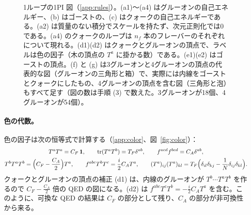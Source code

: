 \documentclass[a4paper,10pt]{ltjsarticle}
\newcommand{\tr}{\mathrm{tr}}
\begin{document}
\begin{figure}[tbp]
\caption{1ループの1PI 図（\ref{app:rules}）。(a1)〜(a4) はグルーオンの自己エネルギー、(b) はゴーストの、(c) はクォークの自己エネルギーである。(a2) は質量のない積分でスケールを持たず、次元正則化では0である。(a4) のクォークのループは $n_f$ 本のフレーバーのそれぞれについて現れる。(d1)(d2) はクォークとグルーオンの頂点で、ラベルは色の因子（木の頂点の $T^a$ に掛かる数）である。(e1)(e2) はゴーストの頂点。(f) と (g) は3グルーオンと4グルーオンの頂点の代表的な図（グルーオンの三角形と箱）で、実際には内線をゴーストとクォークにしたもの、4グルーオンの頂点を含む図（三角形と泡）もすべて足す（図の数は手順 (3) で数えた。3グルーオンが18個、4グルーオンが54個）。}
\label{fig:oneloop}
\end{figure}

\paragraph{色の代数。}色の因子は次の恒等式で計算する（\ref{app:color}、図~\ref{fig:color}）：
\begin{equation}
\begin{gathered}
T^aT^a=C_F\,\mathbf 1,\qquad \tr(T^aT^b)=T_F\delta^{ab},\qquad f^{acd}f^{bcd}=C_A\delta^{ab},\\
T^bT^aT^b=\Bigl(C_F-\frac{C_A}2\Bigr)T^a,\qquad f^{abc}T^bT^c=\frac i2C_AT^a,\qquad
(T^a)_{ij}(T^a)_{kl}=T_F\Bigl(\delta_{il}\delta_{kj}-\frac1N\delta_{ij}\delta_{kl}\Bigr).
\end{gathered}
\label{eq:color}
\end{equation}
クォークとグルーオンの頂点の補正 (d1) は、内線のグルーオンが $T^b\cdots T^aT^b$ を作るので $C_F-\frac{C_A}2$ 倍の QED の図になる。(d2) は $f^{abc}T^cT^b=-\frac i2C_AT^a$ を含む。このように、可換な QED の結果は $C_F$ の部分として残り、$C_A$ の部分が非可換性から来る。
\end{document}
